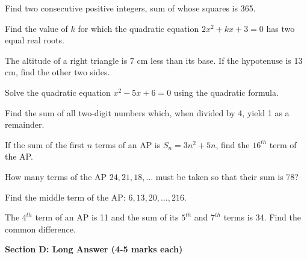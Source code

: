 \documentclass[12pt,a4paper]{exam}
\begin{document}
\begin{questions}
\question[3] Find two consecutive positive integers, sum of whose squares is 365.
\vspace{0.15cm}

\question[3] Find the value of $k$ for which the quadratic equation $2x^2 + kx + 3 = 0$ has two equal real roots.
\vspace{0.15cm}

\question[3] The altitude of a right triangle is 7 cm less than its base. If the hypotenuse is 13 cm, find the other two sides.
\vspace{0.15cm}

\question[3] Solve the quadratic equation $x^2 - 5x + 6 = 0$ using the quadratic formula.
\vspace{0.15cm}

\question[3] Find the sum of all two-digit numbers which, when divided by 4, yield 1 as a remainder.
\vspace{0.15cm}

\question[3] If the sum of the first $n$ terms of an AP is $S_n = 3n^2 + 5n$, find the $16^{th}$ term of the AP.
\vspace{0.15cm}

\question[3] How many terms of the AP $24, 21, 18, \dots$ must be taken so that their sum is 78?
\vspace{0.15cm}

\question[3] Find the middle term of the AP: $6, 13, 20, \dots, 216$.
\vspace{0.15cm}

\question[3] The $4^{th}$ term of an AP is 11 and the sum of its $5^{th}$ and $7^{th}$ terms is 34. Find the common difference.
\vspace{0.15cm}

\end{questions}
\bigskip
\noindent\textbf{\large Section D: Long Answer (4-5 marks each)}
\end{document}
